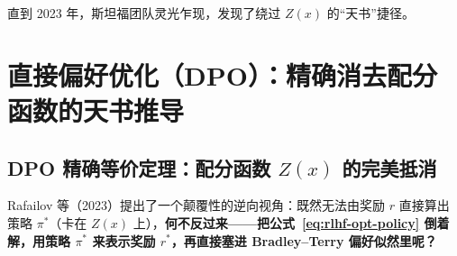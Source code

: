 直到 2023 年，斯坦福团队灵光乍现，发现了绕过 $Z(x)$ 的“天书”捷径。

\section{直接偏好优化（DPO）：精确消去配分函数的天书推导}
\label{sec:dpo}

\subsection{DPO 精确等价定理：配分函数 $Z(x)$ 的完美抵消}

Rafailov 等（2023）提出了一个颠覆性的逆向视角：既然无法由奖励 $r$ 直接算出策略 $\pi^*$（卡在 $Z(x)$ 上），\textbf{何不反过来——把公式~\eqref{eq:rlhf-opt-policy} 倒着解，用策略 $\pi^*$ 来表示奖励 $r^*$，再直接塞进 Bradley--Terry 偏好似然里呢？}

